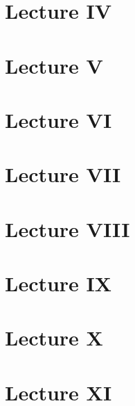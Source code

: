 \documentclass{article}
\numberwithin{equation}{section}
\numberwithin{enumi}{section}
\begin{document}
\section{Lecture IV}
\section{Lecture V}
\section{Lecture VI}
\section{Lecture VII}
\section{Lecture VIII}
\section{Lecture IX}
\section{Lecture X}
\section{Lecture XI}
\end{document}
